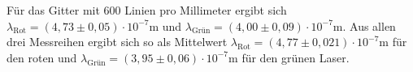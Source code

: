 \noindent
Für das Gitter mit 600 Linien pro Millimeter ergibt sich $\lambda_\text{Rot} = (4,73 \pm 0,05) \cdot 10^{-7} \si{\meter}$ und
$\lambda_\text{Grün} = (4,00 \pm 0,09) \cdot 10^{-7} \si{\meter}$.
\newline \newline
Aus allen drei Messreihen ergibt sich so als Mittelwert $\lambda_\text{Rot} = (4,77 \pm 0,021) \cdot 10^{-7} \si{\meter}$ für den roten und
$\lambda_\text{Grün} = (3,95 \pm 0,06) \cdot 10^{-7} \si{\meter}$ für den grünen Laser.